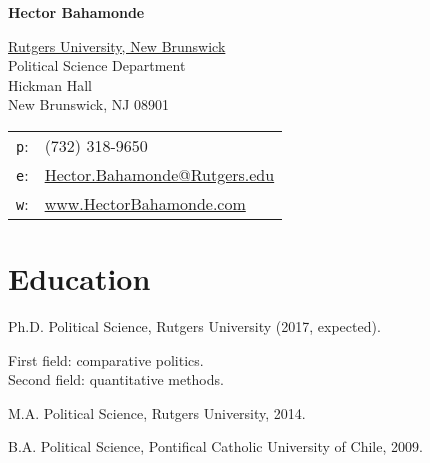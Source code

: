 \documentclass[letterpaper]{article}
\def\name{Hector Bahamonde}
\renewenvironment{itemize}{
  \begin{list}{}{
    \setlength{\leftmargin}{1.5em}
  }
}{
  \end{list}
}
\begin{document}

\centerline{\huge \bf \name}

\vspace{0.25in}

\begin{minipage}{0.45\linewidth}
  \href{http://www.rutgers.edu/}{Rutgers University, New Brunswick} \\
  Political Science Department \\
  Hickman Hall \\
  New Brunswick, NJ 08901
\end{minipage}
\begin{minipage}{0.45\linewidth}
  \begin{tabular}{ll}
    \texttt{p}: & (732) 318-9650 \\
    \texttt{e}: & \href{mailto:hector.bahamonde@rutgers.edu}{Hector.Bahamonde@Rutgers.edu} \\
    \texttt{w}: & \href{http://www.hectorbahamonde.com}{www.HectorBahamonde.com} \\
  \end{tabular}
\end{minipage}


%


\section*{Education}

\begin{itemize}
  \item Ph.D. Political Science, Rutgers University (2017, expected).
  	\begin{itemize}
  		\item First field: {\small comparative politics}. \\ Second field: {\small quantitative methods}.
	\end{itemize}

  \item M.A. Political Science, Rutgers University, 2014.

  \item B.A. Political Science, Pontifical Catholic University of Chile, 2009.
\end{itemize}
\end{document}
